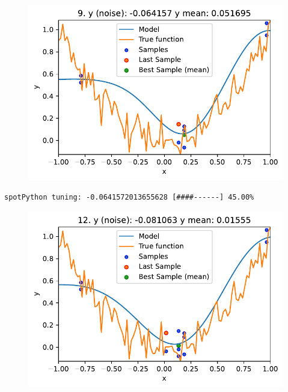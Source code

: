 \documentclass[
  letterpaper,
  DIV=11,
  numbers=noendperiod]{scrreprt}
\begin{document}
\begin{figure}[H]

{\centering \includegraphics{09_spot_ocba_files/figure-pdf/cell-6-output-2.pdf}

}

\end{figure}

\begin{verbatim}
spotPython tuning: -0.0641572013655628 [####------] 45.00% 
\end{verbatim}

\begin{figure}[H]

{\centering \includegraphics{09_spot_ocba_files/figure-pdf/cell-6-output-4.pdf}

}

\end{figure}
\end{document}
